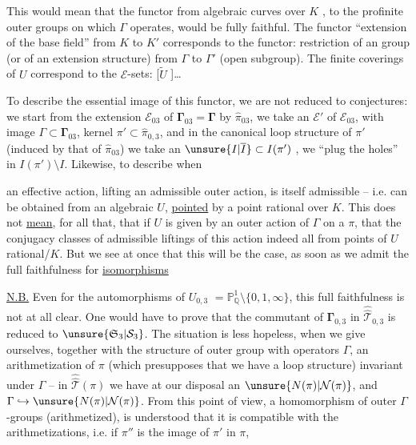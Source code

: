 This would mean that the functor from algebraic
curves over $K$ , to the profinite outer groups
on which $\Gamma$ operates, would be fully faithful.
The functor ``extension of the base field'' from
$K$ to $K'$ corresponds to the functor: restriction
of an  group (or of an extension
structure) from $\Gamma$ to $\Gamma'$ (open subgroup).
The finite  coverings of $U$ correspond to the
$\mathcal E$-sets: [$\widetilde U$ ]\ldots

To describe the essential image of this
functor, we are not reduced to conjectures:
we start from the  extension $\mathcal E_{03}$ of $\boldsymbol{\Gamma}_{03}=\boldsymbol{\Gamma}$
by $\widehat{\pi}_{03}$, we take an   $\mathcal E'$
of $\mathcal E_{03}$, with image $\Gamma\subset\boldsymbol{\Gamma}_{03}$, kernel
$\pi'\subset\widehat{\pi}_{0,3}$, and in the canonical loop structure
of $\pi'$  (induced by that of $\widehat{\pi}_{03}$)
we take an $\unsure{I|\overline I}\subset I(\pi')$ ,  we ``plug the holes''
in $I(\pi')\setminus I$. Likewise, to describe when

an effective action, lifting an admissible outer
action, is itself admissible -- 
i.e. can be obtained from an algebraic 
$U$, \uline{pointed} by a point rational over $K$.
This does not \uline{mean}, for all that, that if
$U$ is given by an outer action of $\Gamma$ on a $\pi$,
that the conjugacy classes of admissible liftings
of this action indeed all  from
points of $U$ rational/$K$. But we see at once that
this will be the case, as soon as we admit the
full faithfulness for \uline{isomorphisms}

\uline{N.B.} Even for the automorphisms of $U_{0,3}$
$=\mathbb P^1_{\mathbb Q}\setminus\{0,1,\infty\}$, this full faithfulness is not
at all clear. One would have to prove that 
the commutant of $\boldsymbol{\Gamma}_{0,3}$ in $\widehat{\widehat{\mathcal T}}_{0,3}$ is reduced
to $\unsure{\mathfrak S_3|\mathcal S_3}$. The situation is less hopeless,
when we give ourselves, together with the structure of
 outer group with operators $\Gamma$, an arithmetization
of $\pi$ (which presupposes that we have 
a loop structure) invariant under  $\Gamma$
--  in $\widehat{\widehat{\mathcal T}}(\pi)$ we have at our disposal an $\unsure{N(\pi)|\mathcal N(\pi)}$,
and $\Gamma\hookrightarrow\unsure{N(\pi)|\mathcal N(\pi)}$. From this point of view,  a
homomorphism  of outer $\Gamma$-groups (arithmetized),
 is understood that it is compatible with
the arithmetizations, i.e. if $\pi''$ is the image of $\pi'$ in $\pi$,

